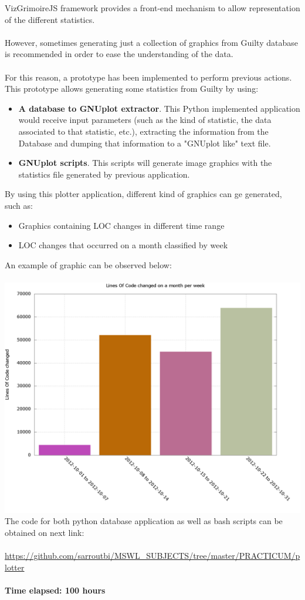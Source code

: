 \documentclass[11pt]{article}
\begin{document}
VizGrimoireJS framework provides a front-end mechanism to allow representation of the different statistics.\\
\\
However, sometimes generating just a collection of graphics from Guilty database is recommended in order to ease the understanding of the data.\\
\\
For this reason, a prototype has been implemented to perform previous actions. This prototype allows generating some statistics from Guilty by using:
\begin{itemize}
\item{\textbf{A database to GNUplot extractor}}. This Python implemented application would receive input parameters (such as the kind of statistic, the data associated to that statistic, etc.), extracting the information from the Database and dumping that information to a "GNUplot like" text file.
\item{\textbf{GNUplot scripts}}. This scripts will generate image graphics with the statistics file generated by previous application.
\end{itemize}
By using this plotter application, different kind of graphics can ge generated, such as:
\begin{itemize}
\item{Graphics containing LOC changes in different time range}
\item{LOC changes that occurred on a month classified by week}
\end{itemize}
An example of graphic can be observed below:\\
\\
\includegraphics[scale=0.25]{stats_monthweeks.png}
The code for both python database application as well as bash scripts can be obtained on next link:\\
\\
\url{https://github.com/sarroutbi/MSWL_SUBJECTS/tree/master/PRACTICUM/plotter}\\
\\
\textbf{Time elapsed: 100 hours}
\end{document}

